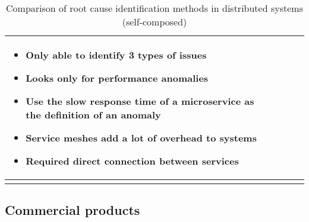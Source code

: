 \begin{longtable}{| p{20mm} | p{40mm} | p{43mm} | p{46mm} |}
\begin{itemize}[leftmargin=*,noitemsep,nolistsep]
    \item Only able to identify 3 types of issues
    \item Looks only for performance anomalies
    \item Use the slow response time of a microservice as the definition of an anomaly
    \item Service meshes add a lot of overhead to systems
    \item Required direct connection between services
  \vspace{-7mm}
  \end{itemize} \\ \hline
  \caption{Comparison of root cause identification methods in distributed systems (self-composed)}
\end{longtable}

\subsection{Commercial products}

